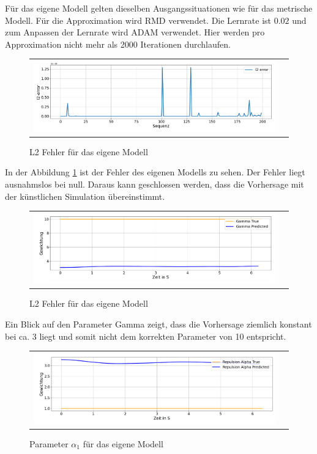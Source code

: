 Für das eigene Modell gelten dieselben Ausgangssituationen wie für das metrische Modell. Für die Approximation wird RMD verwendet.
Die Lernrate ist $0.02$ und zum Anpassen der Lernrate wird ADAM verwendet. Hier werden pro Approximation nicht mehr als 2000 Iterationen durchlaufen.

\begin{figure}[H]
\centering
\begin{tabular}{cc}
\includegraphics[width=1.0\textwidth]{figures/Experimente/10Fisch/PWD_l2error.png} 
\end{tabular}
\caption{L2 Fehler für das eigene Modell \label{fig:PWD_l2error}}
\end{figure}

In der Abbildung \ref{fig:PWD_l2error} ist der Fehler des eigenen Modells zu sehen. Der Fehler liegt ausnahmslos bei null.
Daraus kann geschlossen werden, dass die Vorhersage mit der künstlichen Simulation übereinstimmt.


\begin{figure}[H]
\centering
\begin{tabular}{cc}
\includegraphics[width=1.0\textwidth]{figures/Experimente/10Fisch/PWD_Gamma.png} 
\end{tabular}
\caption{L2 Fehler für das eigene Modell \label{fig:PWD_Gamma}}
\end{figure}

Ein Blick auf den Parameter Gamma zeigt, dass die Vorhersage ziemlich konstant bei ca. 3 liegt und somit nicht dem korrekten Parameter von 10 entspricht.

\begin{figure}[H]
\centering
\begin{tabular}{cc}
\includegraphics[width=1.0\textwidth]{figures/Experimente/10Fisch/PWD_alpha1.png} 
\end{tabular}
\caption{Parameter $\alpha_1$ für das eigene Modell \label{fig:PWD_Alpha1}}
\end{figure}

